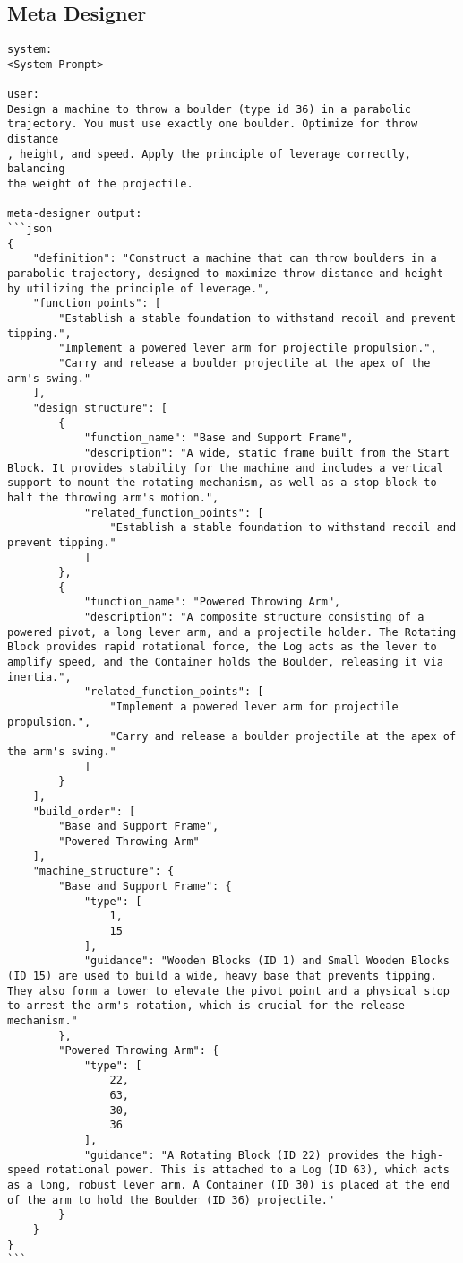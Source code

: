 \subsection{Meta Designer}
\begin{lstlisting}
system:
<System Prompt>

user:
Design a machine to throw a boulder (type id 36) in a parabolic
trajectory. You must use exactly one boulder. Optimize for throw distance
, height, and speed. Apply the principle of leverage correctly, balancing
the weight of the projectile.

meta-designer output:
```json
{
    "definition": "Construct a machine that can throw boulders in a parabolic trajectory, designed to maximize throw distance and height by utilizing the principle of leverage.",
    "function_points": [
        "Establish a stable foundation to withstand recoil and prevent tipping.",
        "Implement a powered lever arm for projectile propulsion.",
        "Carry and release a boulder projectile at the apex of the arm's swing."
    ],
    "design_structure": [
        {
            "function_name": "Base and Support Frame",
            "description": "A wide, static frame built from the Start Block. It provides stability for the machine and includes a vertical support to mount the rotating mechanism, as well as a stop block to halt the throwing arm's motion.",
            "related_function_points": [
                "Establish a stable foundation to withstand recoil and prevent tipping."
            ]
        },
        {
            "function_name": "Powered Throwing Arm",
            "description": "A composite structure consisting of a powered pivot, a long lever arm, and a projectile holder. The Rotating Block provides rapid rotational force, the Log acts as the lever to amplify speed, and the Container holds the Boulder, releasing it via inertia.",
            "related_function_points": [
                "Implement a powered lever arm for projectile propulsion.",
                "Carry and release a boulder projectile at the apex of the arm's swing."
            ]
        }
    ],
    "build_order": [
        "Base and Support Frame",
        "Powered Throwing Arm"
    ],
    "machine_structure": {
        "Base and Support Frame": {
            "type": [
                1,
                15
            ],
            "guidance": "Wooden Blocks (ID 1) and Small Wooden Blocks (ID 15) are used to build a wide, heavy base that prevents tipping. They also form a tower to elevate the pivot point and a physical stop to arrest the arm's rotation, which is crucial for the release mechanism."
        },
        "Powered Throwing Arm": {
            "type": [
                22,
                63,
                30,
                36
            ],
            "guidance": "A Rotating Block (ID 22) provides the high-speed rotational power. This is attached to a Log (ID 63), which acts as a long, robust lever arm. A Container (ID 30) is placed at the end of the arm to hold the Boulder (ID 36) projectile."
        }
    }
}
```

\end{lstlisting}


